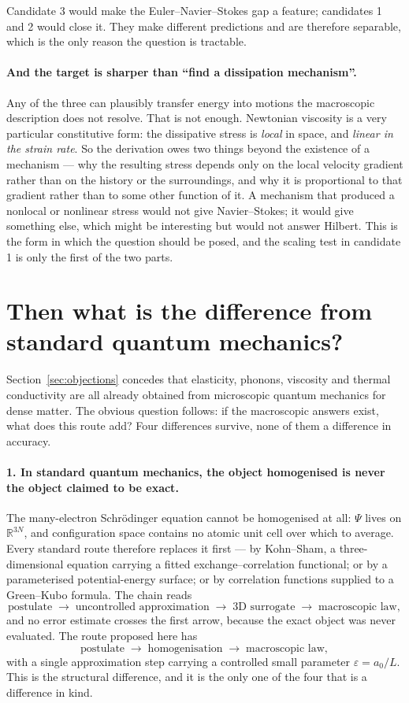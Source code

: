 \documentclass[11pt]{article}
\begin{document}
Candidate 3 would make the Euler--Navier--Stokes gap a feature; candidates 1 and 2 would close it.
They make different predictions and are therefore separable, which is the only reason the question
is tractable.

\paragraph{And the target is sharper than ``find a dissipation mechanism''.} Any of the three can
plausibly transfer energy into motions the macroscopic description does not resolve. That is not
enough. Newtonian viscosity is a very particular constitutive form: the dissipative stress is
\emph{local} in space, and \emph{linear in the strain rate}. So the derivation owes two things
beyond the existence of a mechanism --- why the resulting stress depends only on the local velocity
gradient rather than on the history or the surroundings, and why it is proportional to that gradient
rather than to some other function of it. A mechanism that produced a nonlocal or nonlinear stress
would not give Navier--Stokes; it would give something else, which might be interesting but would
not answer Hilbert. This is the form in which the question should be posed, and the scaling test in
candidate 1 is only the first of the two parts.

\section{Then what is the difference from standard quantum mechanics?}\label{sec:vs-std}

Section~\ref{sec:objections} concedes that elasticity, phonons, viscosity and thermal conductivity
are all already obtained from microscopic quantum mechanics for dense matter. The obvious question
follows: if the macroscopic answers exist, what does this route add? Four differences survive, none
of them a difference in accuracy.

\paragraph{1. In standard quantum mechanics, the object homogenised is never the object claimed to
be exact.} The many-electron Schr\"odinger equation cannot be homogenised at all:
$\Psi$ lives on $\mathbb{R}^{3N}$, and configuration space contains no atomic unit cell over which
to average. Every standard route therefore replaces it first --- by Kohn--Sham, a three-dimensional
equation carrying a fitted exchange--correlation functional; or by a parameterised potential-energy
surface; or by correlation functions supplied to a Green--Kubo formula. The chain reads
\[
\text{postulate} \;\longrightarrow\; \text{uncontrolled approximation} \;\longrightarrow\;
\text{3D surrogate} \;\longrightarrow\; \text{macroscopic law},
\]
and no error estimate crosses the first arrow, because the exact object was never evaluated. The
route proposed here has
\[
\text{postulate} \;\longrightarrow\; \text{homogenisation} \;\longrightarrow\;
\text{macroscopic law},
\]
with a single approximation step carrying a controlled small parameter $\varepsilon=a_0/L$. This is
the structural difference, and it is the only one of the four that is a difference in kind.
\end{document}
